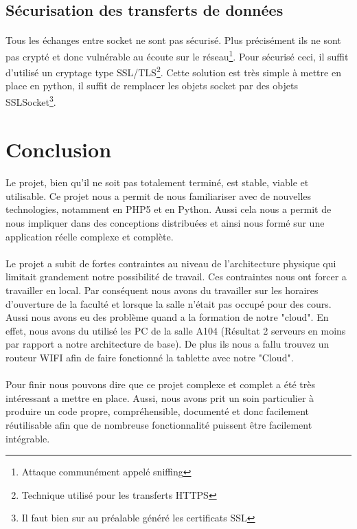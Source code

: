\documentclass[a4paper,12pt]{article}
\begin{document}
\subsection{Sécurisation des transferts de données}
\paragraph*{}
Tous les échanges entre socket ne sont pas sécurisé. Plus précisément ils ne sont pas crypté et donc vulnérable au écoute sur le réseau\footnote{Attaque communément appelé sniffing}. Pour sécurisé ceci, il suffit d'utilisé un cryptage type SSL/TLS\footnote{Technique utilisé pour les transferts HTTPS}. Cette solution est très simple à mettre en place en python, il suffit de remplacer les objets socket par des objets SSLSocket\footnote{Il faut bien sur au préalable généré les certificats SSL}.

\newpage

\section{Conclusion}
\paragraph*{}

Le projet, bien qu'il ne soit pas totalement terminé, est stable, viable et utilisable. Ce projet nous a permit de nous familiariser avec de nouvelles technologies, notamment en PHP5 et en Python. Aussi cela nous a permit de nous impliquer dans des conceptions distribuées et ainsi nous formé sur une application réelle complexe et complète.

\paragraph*{}
Le projet a subit de fortes contraintes au niveau de l'architecture physique qui limitait grandement notre possibilité de travail. Ces contraintes nous ont forcer a travailler en local. Par conséquent nous avons du travailler sur les horaires d'ouverture de la faculté et lorsque la salle n'était pas occupé pour des cours. Aussi nous avons eu des problème quand a la formation de notre "cloud". En effet, nous avons du utilisé les PC de la salle A104 (Résultat 2 serveurs en moins par rapport a notre architecture de base). De plus ils nous a fallu trouvez un routeur WIFI afin de faire fonctionné la tablette avec notre "Cloud".

\paragraph*{}
Pour finir nous pouvons dire que ce projet complexe et complet a été très intéressant a mettre en place. Aussi, nous avons prit un soin particulier à produire un code propre, compréhensible, documenté et donc facilement réutilisable afin que de nombreuse fonctionnalité puissent être facilement intégrable. 


\newpage
\listoffigures
\end{document}
